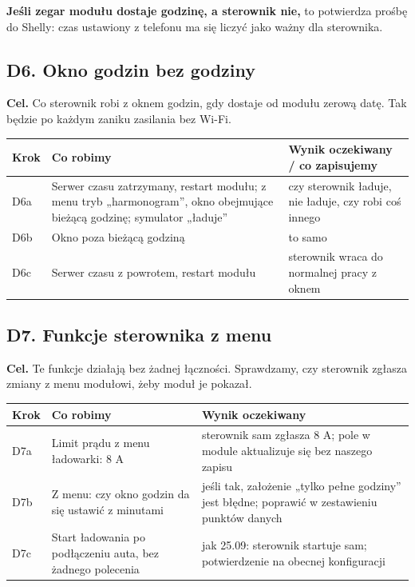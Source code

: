 \documentclass[11pt,a4paper]{article}
\begin{document}
\textbf{Jeśli zegar modułu dostaje godzinę, a sterownik nie,} to potwierdza prośbę do Shelly: czas ustawiony z telefonu ma się liczyć jako ważny dla sterownika.


\subsection{D6. Okno godzin bez godziny}

\textbf{Cel.} Co sterownik robi z oknem godzin, gdy dostaje od modułu zerową datę. Tak będzie po każdym zaniku zasilania bez Wi-Fi.


\begin{longtable}{>{\raggedright\arraybackslash}p{3.00cm}>{\raggedright\arraybackslash}p{7.23cm}>{\raggedright\arraybackslash}p{5.05cm}}
\toprule
\rowcolor{apteallight}\textbf{Krok} & \textbf{Co robimy} & \textbf{Wynik oczekiwany / co zapisujemy} \\
\midrule\endhead
\bottomrule\endfoot
D6a & Serwer czasu zatrzymany, restart modułu; z menu tryb „harmonogram”, okno obejmujące bieżącą godzinę; symulator „ładuje” & czy sterownik ładuje, nie ładuje, czy robi coś innego \\
D6b & Okno poza bieżącą godziną & to samo \\
D6c & Serwer czasu z powrotem, restart modułu & sterownik wraca do normalnej pracy z oknem \\
\end{longtable}

\subsection{D7. Funkcje sterownika z menu}

\textbf{Cel.} Te funkcje działają bez żadnej łączności. Sprawdzamy, czy sterownik zgłasza zmiany z menu modułowi, żeby moduł je pokazał.


\begin{longtable}{>{\raggedright\arraybackslash}p{3.00cm}>{\raggedright\arraybackslash}p{4.70cm}>{\raggedright\arraybackslash}p{7.58cm}}
\toprule
\rowcolor{apteallight}\textbf{Krok} & \textbf{Co robimy} & \textbf{Wynik oczekiwany} \\
\midrule\endhead
\bottomrule\endfoot
D7a & Limit prądu z menu ładowarki: 8 A & sterownik sam zgłasza 8 A; pole w module aktualizuje się bez naszego zapisu \\
D7b & Z menu: czy okno godzin da się ustawić z minutami & jeśli tak, założenie „tylko pełne godziny” jest błędne; poprawić w zestawieniu punktów danych \\
D7c & Start ładowania po podłączeniu auta, bez żadnego polecenia & jak 25.09: sterownik startuje sam; potwierdzenie na obecnej konfiguracji \\
\end{longtable}
\end{document}
